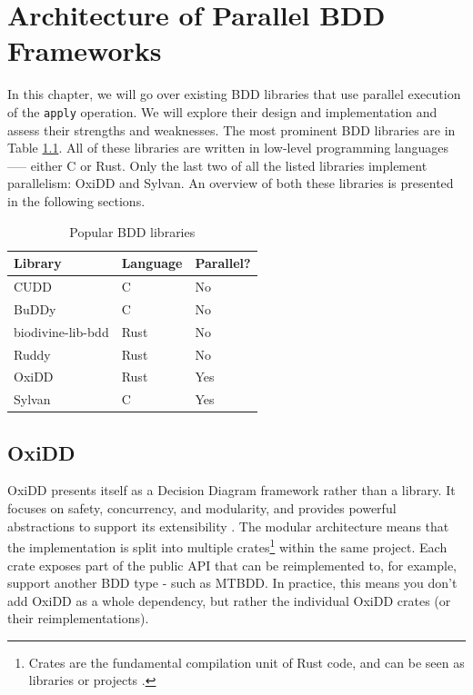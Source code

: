 \chapter{Architecture of Parallel BDD Frameworks}
\label{chap:other-impls}

In this chapter, we will go over existing BDD libraries that use parallel execution of the \texttt{apply} operation.
We will explore their design and implementation and assess their strengths and weaknesses. The most prominent BDD
libraries are in Table \ref{tab:bdd-libraries}. All of these libraries are written in low-level programming languages
—-- either C or Rust. Only the last two of all the listed libraries implement parallelism: OxiDD and Sylvan. An
overview of both these libraries is presented in the following sections.

\begin{table}[htbp]
  \begin{tabularx}{\textwidth}{llX}
    \toprule
    Library & Language & Parallel? \\
    \midrule
    CUDD              & C    & No  \\
    BuDDy             & C    & No  \\
    biodivine-lib-bdd & Rust & No  \\
    Ruddy             & Rust & No  \\
    OxiDD             & Rust & Yes \\
    Sylvan            & C    & Yes \\
    \bottomrule
  \end{tabularx}
  \caption{Popular BDD libraries}
  \label{tab:bdd-libraries}
\end{table}


\section{OxiDD}
\label{chap:other-impls:oxidd}

OxiDD presents itself as a Decision Diagram framework rather than a library. It focuses on safety, concurrency, and
modularity, and provides powerful abstractions to support its extensibility \cite{oxidd}. The modular architecture
means that the implementation is split into multiple crates\footnote{Crates are the fundamental compilation unit of
Rust code, and can be seen as libraries or projects \cite[keyword.crate]{rust-docs}.} within the same project. Each
crate exposes part of the public API that can be reimplemented to, for example, support another BDD type - such as
MTBDD. In practice, this means you don't add OxiDD as a whole dependency, but rather the individual OxiDD crates (or
their reimplementations).

